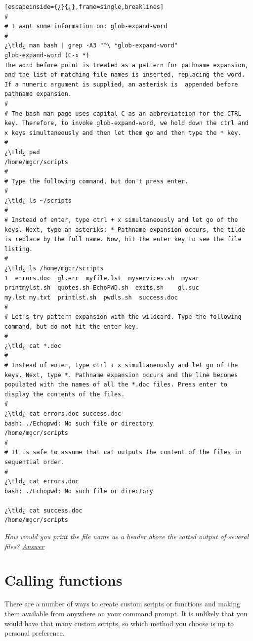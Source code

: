 \begin{lstlisting}[escapeinside={¿}{¿},frame=single,breaklines]
#
# I want some information on: glob-expand-word
#
¿\tld¿ man bash | grep -A3 "^\ *glob-expand-word"
glob-expand-word (C-x *)
The word before point is treated as a pattern for pathname expansion, and the list of matching file names is inserted, replacing the word. If a numeric argument is supplied, an asterisk is  appended before pathname expansion.
#
# The bash man page uses capital C as an abbreviateion for the CTRL key. Therefore, to invoke glob-expand-word, we hold down the ctrl and x keys simultaneously and then let them go and then type the * key.
#
¿\tld¿ pwd
/home/mgcr/scripts
#
# Type the following command, but don't press enter.
#
¿\tld¿ ls ~/scripts	
#
# Instead of enter, type ctrl + x simultaneously and let go of the keys. Next, type an asteriks: * Pathname expansion occurs, the tilde is replace by the full name. Now, hit the enter key to see the file listing.
#
¿\tld¿ ls /home/mgcr/scripts 
1  errors.doc  gl.err  myfile.lst  myservices.sh  myvar        
printmylst.sh  quotes.sh EchoPWD.sh  exits.sh    gl.suc  
my.lst my.txt  printlst.sh  pwdls.sh  success.doc
#
# Let's try pattern expansion with the wildcard. Type the following command, but do not hit the enter key.
#
¿\tld¿ cat *.doc
#
# Instead of enter, type ctrl + x simultaneously and let go of the keys. Next, type *. Pathname expansion occurs and the line becomes populated with the names of all the *.doc files. Press enter to display the contents of the files.
#
¿\tld¿ cat errors.doc success.doc 
bash: ./Echopwd: No such file or directory
/home/mgcr/scripts
#
# It is safe to assume that cat outputs the content of the files in sequential order.
#
¿\tld¿ cat errors.doc
bash: ./Echopwd: No such file or directory

¿\tld¿ cat success.doc
/home/mgcr/scripts
\end{lstlisting}

\tbi{\textcolor{red}{Challenge:}} \textit{How would you print the file name as a header above the catted output of several files? \hyperlink{catfileheaders}{Answer}}

\section{Calling functions}

There are a number of ways to create custom scripts or functions and making them available from anywhere on your command prompt. It is unlikely that you would have that many custom scripts, so which method you choose is up to personal preference.

